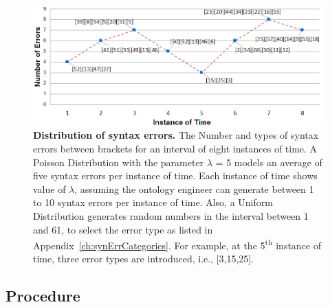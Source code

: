 \begin{figure}[ht]
	\begin{center}
		\includegraphics[scale=0.55,angle=0]{images/Experiment02-01.png}
		\vspace*{-3mm}
		\caption{\textbf{Distribution of syntax errors.} The Number and types of syntax errors between brackets for an interval of eight instances of time. 
		A Poisson Distribution with the parameter $\lambda$ = 5 models an average of five syntax errors per instance of time. 
		Each instance of time shows value of $\lambda$, assuming the ontology engineer can generate between 1 to 10 syntax errors per instance of time. 
		Also, a Uniform Distribution generates random numbers in the interval between 1 and 61, to select the error type as listed in Appendix~\ref{ch:synErrCategories}. 
		For example, at the 5\textsuperscript{th} instance of time, three error types are introduced, i.e., [3,15,25].} 
		\label{Fig:experiment2}
	\end{center}
\end{figure}

\subsection{Procedure}

